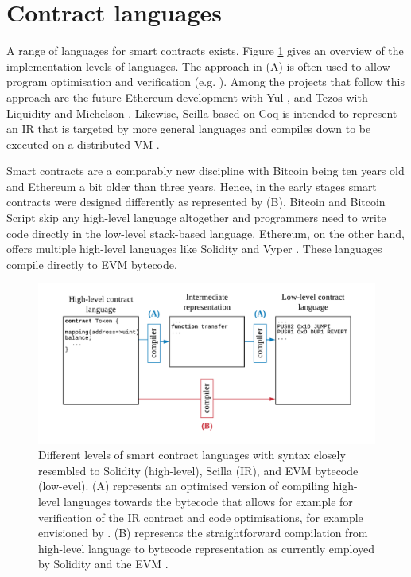 \section{Contract languages}
\label{languages}

A range of languages for smart contracts exists. Figure \ref{fig:lang} gives an overview of the implementation levels of languages.
The approach in (A) is often used to allow program optimisation and verification (e.g. \cite{Lattner2004}). 
Among the projects that follow this approach are the future Ethereum development with Yul \cite{EthereumFoundation2018IULIA}, and Tezos with Liquidity \cite{OCamlProSAS2018} and Michelson \cite{DynamicLedgerSolutions2017}.
Likewise, Scilla based on Coq is intended to represent an IR that is targeted by more general languages and compiles down to be executed on a distributed VM \cite{Sergey2018}.

Smart contracts are a comparably new discipline with Bitcoin being ten years old and Ethereum a bit older than three years.
Hence, in the early stages smart contracts were designed differently as represented by (B).
Bitcoin and Bitcoin Script \cite{BitcoinWiki2018Script} skip any high-level language altogether and programmers need to write code directly in the low-level stack-based language.
Ethereum, on the other hand, offers multiple high-level languages like Solidity \cite{Ethereum2018Solidity} and Vyper \cite{Ethereum2018Vyper}.
These languages compile directly to EVM bytecode. 

\begin{figure}
\label{fig:lang}
\includegraphics[width=\textwidth]{fig/Language.pdf}
\caption{Different levels of smart contract languages with syntax closely resembled to Solidity (high-level), Scilla (IR), and EVM bytecode (low-evel). (A) represents an optimised version of compiling high-level languages towards the bytecode that allows for example for verification of the IR contract and code optimisations, for example envisioned by \cite{Sergey2018,OCamlProSAS2018}. (B) represents the straightforward compilation from high-level language to bytecode representation as currently employed by Solidity and the EVM \cite{Ethereum2018Solidity,Wood2014}.}
\end{figure}


